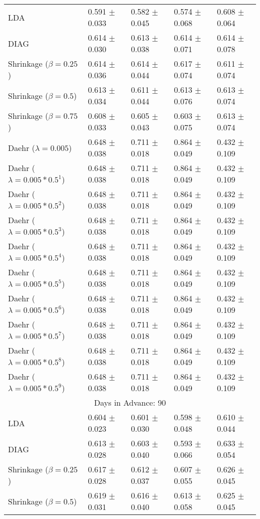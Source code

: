 \begin{table}
\begin{tabular}{*{5}{l}}
LDA&0.591 $\pm$ 0.033&0.582 $\pm$ 0.045&0.574 $\pm$ 0.068&0.608 $\pm$ 0.064\\
DIAG&0.614 $\pm$ 0.030&0.613 $\pm$ 0.038&0.614 $\pm$ 0.071&0.614 $\pm$ 0.078\\
Shrinkage ($\beta=0.25$)&0.614 $\pm$ 0.036&0.614 $\pm$ 0.044&0.617 $\pm$ 0.074&0.611 $\pm$ 0.074\\
Shrinkage ($\beta=0.5$)&0.613 $\pm$ 0.034&0.611 $\pm$ 0.044&0.613 $\pm$ 0.076&0.613 $\pm$ 0.074\\
Shrinkage ($\beta=0.75$)&0.608 $\pm$ 0.033&0.605 $\pm$ 0.043&0.603 $\pm$ 0.075&0.613 $\pm$ 0.074\\
Daehr ($\lambda=0.005$)&0.648 $\pm$ 0.038&0.711 $\pm$ 0.018&0.864 $\pm$ 0.049&0.432 $\pm$ 0.109\\
Daehr ($\lambda=0.005*0.5^1$)&0.648 $\pm$ 0.038&0.711 $\pm$ 0.018&0.864 $\pm$ 0.049&0.432 $\pm$ 0.109\\
Daehr ($\lambda=0.005*0.5^2$)&0.648 $\pm$ 0.038&0.711 $\pm$ 0.018&0.864 $\pm$ 0.049&0.432 $\pm$ 0.109\\
Daehr ($\lambda=0.005*0.5^3$)&0.648 $\pm$ 0.038&0.711 $\pm$ 0.018&0.864 $\pm$ 0.049&0.432 $\pm$ 0.109\\
Daehr ($\lambda=0.005*0.5^4$)&0.648 $\pm$ 0.038&0.711 $\pm$ 0.018&0.864 $\pm$ 0.049&0.432 $\pm$ 0.109\\
Daehr ($\lambda=0.005*0.5^5$)&0.648 $\pm$ 0.038&0.711 $\pm$ 0.018&0.864 $\pm$ 0.049&0.432 $\pm$ 0.109\\
Daehr ($\lambda=0.005*0.5^6$)&0.648 $\pm$ 0.038&0.711 $\pm$ 0.018&0.864 $\pm$ 0.049&0.432 $\pm$ 0.109\\
Daehr ($\lambda=0.005*0.5^7$)&0.648 $\pm$ 0.038&0.711 $\pm$ 0.018&0.864 $\pm$ 0.049&0.432 $\pm$ 0.109\\
Daehr ($\lambda=0.005*0.5^8$)&0.648 $\pm$ 0.038&0.711 $\pm$ 0.018&0.864 $\pm$ 0.049&0.432 $\pm$ 0.109\\
Daehr ($\lambda=0.005*0.5^9$)&0.648 $\pm$ 0.038&0.711 $\pm$ 0.018&0.864 $\pm$ 0.049&0.432 $\pm$ 0.109\\
\hline\multicolumn{5}{c}{  Days in Advance: 90}\\\hline
LDA&0.604 $\pm$ 0.023&0.601 $\pm$ 0.030&0.598 $\pm$ 0.048&0.610 $\pm$ 0.044\\
DIAG&0.613 $\pm$ 0.028&0.603 $\pm$ 0.040&0.593 $\pm$ 0.066&0.633 $\pm$ 0.054\\
Shrinkage ($\beta=0.25$)&0.617 $\pm$ 0.028&0.612 $\pm$ 0.037&0.607 $\pm$ 0.055&0.626 $\pm$ 0.045\\
Shrinkage ($\beta=0.5$)&0.619 $\pm$ 0.031&0.616 $\pm$ 0.040&0.613 $\pm$ 0.058&0.625 $\pm$ 0.045\\

\end{tabular}
\end{table}
